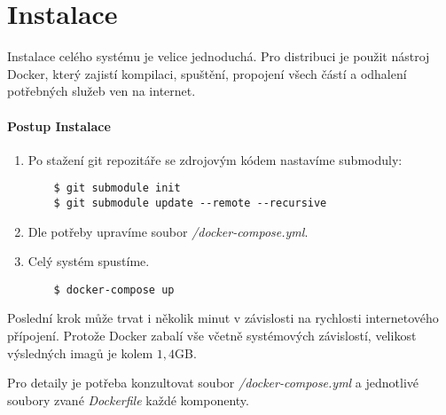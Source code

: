 
\chapter{Instalace} \label{analyza}

Instalace celého systému je velice jednoduchá. Pro distribuci je použit nástroj
Docker, který zajistí kompilaci, spuštění, propojení všech částí a odhalení
potřebných služeb ven na internet. \citep[viz][]{DockerDocs}


\subsubsection*{Postup Instalace}

\begin{enumerate}
  \item Po stažení git repozitáře se zdrojovým kódem nastavíme submoduly:\\
  \begin{lstlisting}
    $ git submodule init
    $ git submodule update --remote --recursive
  \end{lstlisting}
  \item Dle potřeby upravíme soubor \textit{/docker-compose.yml}.
  \item Celý systém spustíme.\\
  \begin{lstlisting}
    $ docker-compose up
  \end{lstlisting}
\end{enumerate}

Poslední krok může trvat i několik minut v závislosti na rychlosti internetového
přípojení. Protože Docker zabalí vše včetně systémových závislostí, velikost
výsledných imagů je kolem $1,4$GB.

Pro detaily je potřeba konzultovat soubor \textit{/docker-compose.yml} a jednotlivé soubory
zvané \textit{Dockerfile} každé komponenty.
